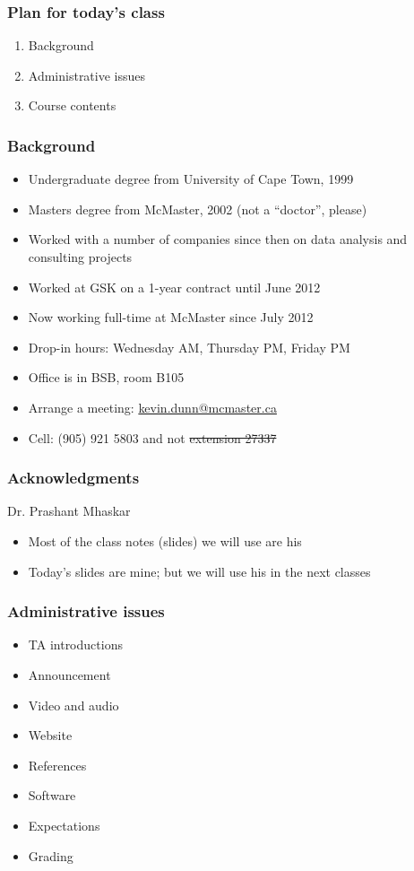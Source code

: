 
\begin{frame}\frametitle{Plan for today's class}
	\begin{enumerate}
		\item	Background 
		\item	Administrative issues 
		\item	Course contents 
	\end{enumerate}
\end{frame}

\begin{frame}\frametitle{Background}
	{\color{myGreen}{About myself}}
	\begin{itemize}
		\item	Undergraduate degree from University of Cape Town, 1999
		\item	Masters degree from McMaster, 2002 (not a ``doctor'', please)
		\item	Worked with a number of companies since then on data analysis and consulting projects
		\item	Worked at GSK on a 1-year contract until June 2012
		\item	Now working full-time at McMaster since July 2012
		\item	Drop-in hours: Wednesday AM, Thursday PM, Friday PM
		\item	Office is in BSB, room B105
		\item	Arrange a meeting: \url{kevin.dunn@mcmaster.ca}
		\item	Cell: (905) 921 5803 and not \sout{extension 27337}
	\end{itemize}	
\end{frame}

\begin{frame}\frametitle{Acknowledgments}
	Dr. Prashant Mhaskar
	\begin{itemize}
		\item	Most of the class notes (slides) we will use are his
		\item	Today's slides are mine; but we will use his in the next classes
	\end{itemize}
\end{frame}

\begin{frame}\frametitle{Administrative issues}
	\begin{itemize}
		\item	TA introductions 
		\item	Announcement 
		\item	Video and audio 
		\item	Website 
		\item	References 
		\item	Software 
		\item	Expectations 
		\item	Grading 
	\end{itemize}
\end{frame}

